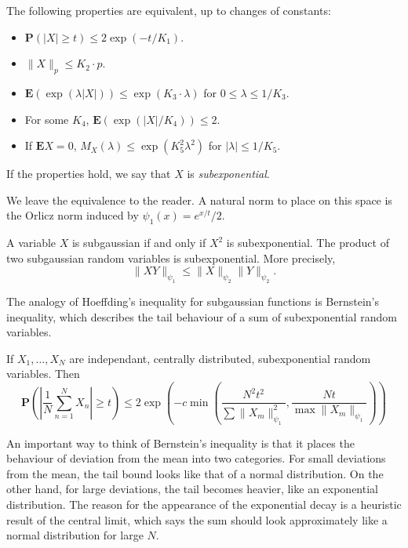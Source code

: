 \begin{theorem}
    The following properties are equivalent, up to changes of constants:
    \begin{itemize}
        \item $\mathbf{P}(|X| \geq t) \leq 2 \exp(-t/K_1)$.
        \item $\| X \|_p \leq K_2 \cdot p$.
        \item $\mathbf{E}(\exp(\lambda |X|)) \leq \exp(K_3 \cdot \lambda)$ for $0 \leq \lambda \leq 1/K_3$.
        \item For some $K_4$, $\mathbf{E}(\exp(|X|/K_4)) \leq 2$.
        \item If $\mathbf{E} X = 0$, $M_X(\lambda) \leq \exp(K_5^2 \lambda^2)$ for $|\lambda| \leq 1/K_5$.
    \end{itemize}
    If the properties hold, we say that $X$ is \emph{subexponential}.
\end{theorem}

We leave the equivalence to the reader. A natural norm to place on this space is the Orlicz norm induced by $\psi_1(x) = e^{x/t}/2$.

\begin{lemma}
    A variable $X$ is subgaussian if and only if $X^2$ is subexponential. The product of two subgaussian random variables is subexponential. More precisely,
    \[ \| X Y \|_{\psi_1} \leq \| X \|_{\psi_2} \| Y \|_{\psi_2}. \]
\end{lemma}

The analogy of Hoeffding's inequality for subgaussian functions is Bernstein's inequality, which describes the tail behaviour of a sum of subexponential random variables.

\begin{theorem}
    If $X_1, \dots, X_N$ are independant, centrally distributed, subexponential random variables. Then
    \[ \mathbf{P} \left( \left| \frac{1}{N} \sum_{n = 1}^N X_n \right| \geq t \right) \leq 2 \exp \left( -c \min \left( \frac{N^2 t^2}{\sum \| X_m \|_{\psi_1}^2}, \frac{N t}{\max \| X_m \|_{\psi_1}} \right) \right) \]
\end{theorem}

An important way to think of Bernstein's inequality is that it places the behaviour of deviation from the mean into two categories. For small deviations from the mean, the tail bound looks like that of a normal distribution. On the other hand, for large deviations, the tail becomes heavier, like an exponential distribution. The reason for the appearance of the exponential decay is a heuristic result of the central limit, which says the sum should look approximately like a normal distribution for large $N$.













